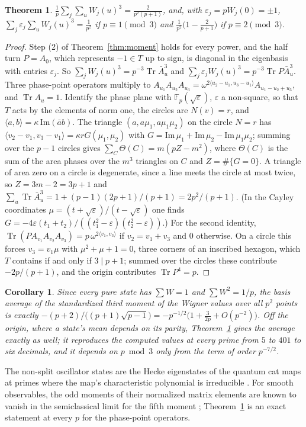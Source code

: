 \documentclass[11pt]{article}
\newtheorem{theorem}{Theorem}
\newtheorem{corollary}{Corollary}
\theoremstyle{remark}
\newcommand{\F}{\mathbb{F}}
\newcommand{\Tr}{\operatorname{Tr}}
\begin{document}
\begin{theorem}\label{thm:third}
$\displaystyle\frac1p\sum_j\sum_u W_j(u)^3=\frac{2}{p^2(p+1)}$, and, with $\varepsilon_j=pW_j(0)=\pm1$,
$\displaystyle\sum_j\varepsilon_j\sum_u W_j(u)^3=\frac1{p^2}$ if $p\equiv1\pmod 3$ and
$\displaystyle\frac1{p^2}\Big(1-\frac{2}{p+1}\Big)$ if $p\equiv2\pmod 3$.
\end{theorem}
\begin{proof}
Step (2) of Theorem~\ref{thm:moment} holds for every power, and the half turn $P=A_0$, which represents $-1\in T$
up to sign, is diagonal in the eigenbasis with entries $\varepsilon_j$. So $\sum_jW_j(u)^3=p^{-3}\Tr\bar A_u^3$ and
$\sum_j\varepsilon_jW_j(u)^3=p^{-3}\Tr P\bar A_u^3$. Three phase-point operators multiply to
$A_{u_1}A_{u_2}A_{u_3}=\omega^{2\langle u_2-u_1,u_3-u_1\rangle}A_{u_1-u_2+u_3}$, and $\Tr A_u=1$. Identify the phase
plane with $\F_p(\sqrt\varepsilon)$, $\varepsilon$ a non-square, so that $T$ acts by the elements of norm one, the circles
are $N(v)=r$, and $\langle a,b\rangle=\kappa\,\mathrm{Im}(\bar ab)$. The triangle $(a,a\mu_1,a\mu_1\mu_2)$ on the circle
$N=r$ has $\langle v_2-v_1,v_3-v_1\rangle=\kappa rG(\mu_1,\mu_2)$ with
$G=\mathrm{Im}\,\mu_1+\mathrm{Im}\,\mu_2-\mathrm{Im}\,\mu_1\mu_2$; summing over the $p-1$ circles gives
$\sum_C\Theta(C)=m(pZ-m^2)$, where $\Theta(C)$ is the sum of the area phases over the $m^3$ triangles on $C$ and
$Z=\#\{G=0\}$. A triangle of area zero on a circle is degenerate, since a line meets the circle at most twice, so
$Z=3m-2=3p+1$ and $\sum_u\Tr\bar A_u^3=1+(p-1)(2p+1)/(p+1)=2p^2/(p+1)$. (In the Cayley coordinates
$\mu=(t+\sqrt\varepsilon)/(t-\sqrt\varepsilon)$ one finds $G=-4\varepsilon(t_1+t_2)/((t_1^2-\varepsilon)(t_2^2-\varepsilon))$.)
For the second identity, $\Tr(PA_{v_1}A_{v_2}A_{v_3})=p\,\omega^{2\langle v_1,v_3\rangle}$ if $v_2=v_1+v_3$ and $0$
otherwise. On a circle this forces $v_3=v_1\mu$ with $\mu^2+\mu+1=0$, three corners of an inscribed hexagon, which
$T$ contains if and only if $3\mid p+1$; summed over the circles these contribute $-2p/(p+1)$, and the origin
contributes $\Tr P^4=p$.
\end{proof}
\begin{corollary}\label{cor:taper}
Since every pure state has $\sum W=1$ and $\sum W^2=1/p$, the basis average of the standardized third moment of the
Wigner values over all $p^2$ points is exactly
$-(p+2)/\big((p+1)\sqrt{p-1}\big)=-p^{-1/2}\big(1+\tfrac{3}{2p}+O(p^{-2})\big)$. Off the origin, where a state's mean
depends on its parity, Theorem~\ref{thm:third} gives the average exactly as well; it reproduces the computed values
at every prime from $5$ to $401$ to six decimals, and it depends on $p\bmod3$ only from the term of order $p^{-7/2}$.
\end{corollary}
The non-split oscillator states are the Hecke eigenstates of the quantum cat maps at primes where the map's
characteristic polynomial is irreducible \cite{KurlbergRudnick2000}. For smooth observables, the odd moments of
their normalized matrix elements are known to vanish in the semiclassical limit for the fifth moment
\cite{Rosenzweig2009}; Theorem~\ref{thm:third} is an exact statement at every $p$ for the phase-point operators.
\end{document}
